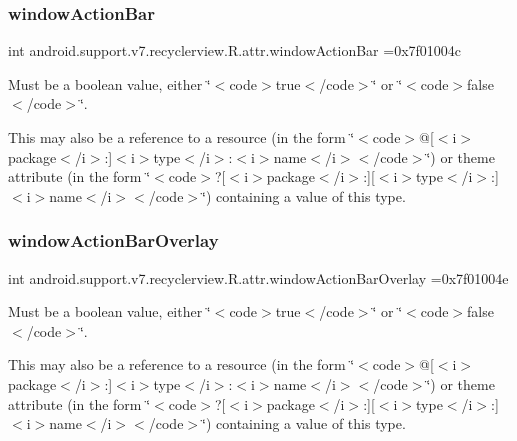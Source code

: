 \subsubsection{\texorpdfstring{window\+Action\+Bar}{windowActionBar}}
{\footnotesize\ttfamily int android.\+support.\+v7.\+recyclerview.\+R.\+attr.\+window\+Action\+Bar =0x7f01004c\hspace{0.3cm}{\ttfamily [static]}}

Must be a boolean value, either \char`\"{}$<$code$>$true$<$/code$>$\char`\"{} or \char`\"{}$<$code$>$false$<$/code$>$\char`\"{}. 

This may also be a reference to a resource (in the form \char`\"{}$<$code$>$@\mbox{[}$<$i$>$package$<$/i$>$\+:\mbox{]}$<$i$>$type$<$/i$>$\+:$<$i$>$name$<$/i$>$$<$/code$>$\char`\"{}) or theme attribute (in the form \char`\"{}$<$code$>$?\mbox{[}$<$i$>$package$<$/i$>$\+:\mbox{]}\mbox{[}$<$i$>$type$<$/i$>$\+:\mbox{]}$<$i$>$name$<$/i$>$$<$/code$>$\char`\"{}) containing a value of this type. \mbox{\label{classandroid_1_1support_1_1v7_1_1recyclerview_1_1R_1_1attr_a3d91a274065951b67649e3a0d462f765}} 
\subsubsection{\texorpdfstring{window\+Action\+Bar\+Overlay}{windowActionBarOverlay}}
{\footnotesize\ttfamily int android.\+support.\+v7.\+recyclerview.\+R.\+attr.\+window\+Action\+Bar\+Overlay =0x7f01004e\hspace{0.3cm}{\ttfamily [static]}}

Must be a boolean value, either \char`\"{}$<$code$>$true$<$/code$>$\char`\"{} or \char`\"{}$<$code$>$false$<$/code$>$\char`\"{}. 

This may also be a reference to a resource (in the form \char`\"{}$<$code$>$@\mbox{[}$<$i$>$package$<$/i$>$\+:\mbox{]}$<$i$>$type$<$/i$>$\+:$<$i$>$name$<$/i$>$$<$/code$>$\char`\"{}) or theme attribute (in the form \char`\"{}$<$code$>$?\mbox{[}$<$i$>$package$<$/i$>$\+:\mbox{]}\mbox{[}$<$i$>$type$<$/i$>$\+:\mbox{]}$<$i$>$name$<$/i$>$$<$/code$>$\char`\"{}) containing a value of this type. \mbox{\label{classandroid_1_1support_1_1v7_1_1recyclerview_1_1R_1_1attr_a61961ac2ae9e9c1aea6ddbadec38a189}} 
